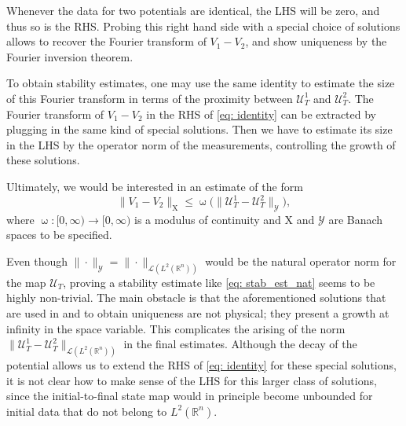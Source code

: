 \documentclass[10pt,a4paper]{amsart}
\theoremstyle{remark}
\theoremstyle{definition}
\newcommand{\R}{\mathbb{R}}
\newcommand{\X}{\mathrm{X}}
\def\cal{\mathcal}
\begin{document}
%
Whenever the data for two potentials are identical, the LHS will be zero, and thus so is the RHS. Probing this right hand side with a special choice of solutions allows to recover the Fourier transform of $V_1-V_2$, and show uniqueness by the Fourier inversion theorem.
%

To obtain stability estimates, one may use the same identity to estimate the size of this Fourier transform in terms of the proximity between $\mathcal U_T^1$ and $\mathcal U_T^2$. The Fourier transform of $V_1-V_2$ in the RHS of \eqref{eq: identity} can be extracted by plugging in the same kind of special solutions. Then we have to estimate its size in the LHS by the operator norm of the measurements, controlling the growth of these solutions.



%
Ultimately, we would be interested in an estimate of the form 
%
\begin{equation}\label{eq: stab_est_nat}
\|V_1-V_2\|_{\X} \leq \upomega \big( \|\cal{U}_T^1 - \cal{U}_T^2 \|_{\mathcal Y}\big),
\end{equation}
%
where $\upomega: [0, \infty) \to [0, \infty)$ is a modulus of continuity and $\X$ and $\mathcal Y$ are Banach spaces to be specified. 
 
Even though $\| \cdot \|_{\cal Y} = \| \cdot \|_{\cal{L}(L^2(\R^n))} $ would be the natural operator norm for the map $\mathcal{U}_T$, proving a stability estimate like \eqref{eq: stab_est_nat} seems to be highly non-trivial. 
The main obstacle is that the aforementioned solutions that are used in \cite{zbMATH08122191} and \cite{zbMATH07801151} to obtain uniqueness are not physical; they present a growth at infinity in the space variable. This complicates the arising of the norm $\|\cal{U}_T^1 - \cal{U}_T^2 \|_{\cal{L}(L^2(\R^n))}$ in the final estimates. Although the decay of the potential allows us to extend the RHS of \eqref{eq: identity} for these special solutions, it is not clear how to make sense of the LHS for this larger class of solutions, since the initial-to-final state map would in principle become unbounded for initial data that do not belong to $L^2(\R^n)$.   
\end{document}
